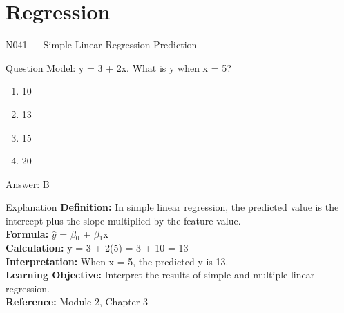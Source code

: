 \documentclass[aspectratio=169,8pt]{beamer}
\begin{document}
	\section{Regression}
	
	\begin{frame}{N041 --- Simple Linear Regression Prediction}
		\begin{block}{Question}
			Model: y = 3 + 2x. What is y when x = 5?
			\begin{enumerate}
				\item 10
				\item 13
				\item 15
				\item 20
			\end{enumerate}
		\end{block}
		\begin{exampleblock}{Answer: B}\end{exampleblock}
		\begin{block}{Explanation}
			\textbf{Definition:} In simple linear regression, the predicted value is the intercept plus the slope multiplied by the feature value.\\
			\textbf{Formula:} $\hat{y}$ = $\beta$$_{0}$ + $\beta$$_{1}$x\\
			\textbf{Calculation:} y = 3 + 2(5) = 3 + 10 = 13\\
			\textbf{Interpretation:} When x = 5, the predicted y is 13.\\
			\textbf{Learning Objective:} Interpret the results of simple and multiple linear regression.\\
			\textbf{Reference:} Module 2, Chapter 3
		\end{block}
	\end{frame}
	
\end{document}
